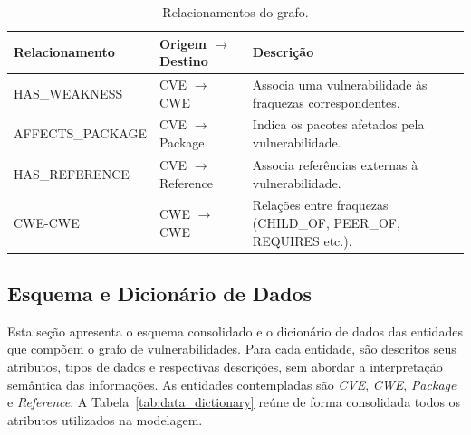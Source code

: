 \begin{table}[ht]
    \centering
    \caption{Relacionamentos do grafo.}
    \label{tab:relationships}
    \small
    \begin{tabular}{|p{3.5cm}|p{3.8cm}|p{6cm}|}
        \hline
        \textbf{Relacionamento} & \textbf{Origem $\rightarrow$ Destino} & \textbf{Descrição}                                             \\
        \hline
        HAS\_WEAKNESS           & CVE $\rightarrow$ CWE                 & Associa uma vulnerabilidade às fraquezas correspondentes.      \\
        \hline
        AFFECTS\_PACKAGE        & CVE $\rightarrow$ Package             & Indica os pacotes afetados pela vulnerabilidade.               \\
        \hline
        HAS\_REFERENCE          & CVE $\rightarrow$ Reference           & Associa referências externas à vulnerabilidade.                \\
        \hline
        CWE-CWE                 & CWE $\rightarrow$ CWE                 & Relações entre fraquezas (CHILD\_OF, PEER\_OF, REQUIRES etc.). \\
        \hline
    \end{tabular}
\end{table}

\subsection{Esquema e Dicionário de Dados}

Esta seção apresenta o esquema consolidado e o dicionário de dados das entidades que compõem o grafo de vulnerabilidades. Para cada entidade, são descritos seus atributos, tipos de dados e respectivas descrições, sem abordar a interpretação semântica das informações. As entidades contempladas são \textit{CVE}, \textit{CWE}, \textit{Package} e \textit{Reference}. A Tabela~\ref{tab:data_dictionary} reúne de forma consolidada todos os atributos utilizados na modelagem.

